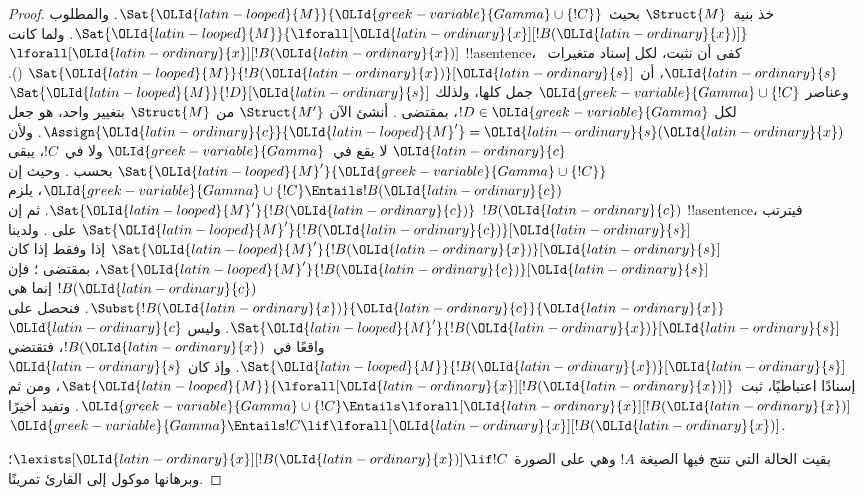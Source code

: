 \documentclass[../../../include/open-logic-section]{subfiles}
\begin{document}
\begin{proof}
{خذ بنية~$\Struct{M}$ بحيث $\Sat{{\OLId{latin-looped}{M}}}{{\OLId{greek-variable}{Gamma}} \cup \{!C\}}$. والمطلوب
$\Sat{{\OLId{latin-looped}{M}}}{\lforall[{\OLId{latin-ordinary}{x}}][!B({\OLId{latin-ordinary}{x}})]}$. ولما كانت
$\lforall[{\OLId{latin-ordinary}{x}}][!B({\OLId{latin-ordinary}{x}})]$ !!a{sentence}، كفى أن نثبت، لكل إسناد
متغيرات~${\OLId{latin-ordinary}{s}}$، أن $\Sat{{\OLId{latin-looped}{M}}}{!B({\OLId{latin-ordinary}{x}})}[{\OLId{latin-ordinary}{s}}]$
(). وعناصر ${\OLId{greek-variable}{Gamma}} \cup \{!C\}$ جمل
كلها، ولذلك $\Sat{{\OLId{latin-looped}{M}}}{!D}[{\OLId{latin-ordinary}{s}}]$ لكل $!D \in {\OLId{greek-variable}{Gamma}}$، بمقتضى
. أنشئ الآن $\Struct{M'}$ من
$\Struct{M}$ بتغيير واحد، هو جعل $\Assign{{\OLId{latin-ordinary}{c}}}{{\OLId{latin-looped}{M}}'} = {\OLId{latin-ordinary}{s}}({\OLId{latin-ordinary}{x}})$. ولأن ${\OLId{latin-ordinary}{c}}$
لا يقع في~${\OLId{greek-variable}{Gamma}}$ ولا في~$!C$، يبقى $\Sat{{\OLId{latin-looped}{M}}'}{{\OLId{greek-variable}{Gamma}} \cup \{!C\}}$
بحسب . وحيث إن ${\OLId{greek-variable}{Gamma}} \cup \{!C\}
\Entails !B({\OLId{latin-ordinary}{c}})$، يلزم $\Sat{{\OLId{latin-looped}{M}}'}{!B({\OLId{latin-ordinary}{c}})}$. ثم إن $!B({\OLId{latin-ordinary}{c}})$ !!a{sentence}،
فيترتب $\Sat{{\OLId{latin-looped}{M}}'}{!B({\OLId{latin-ordinary}{c}})}[{\OLId{latin-ordinary}{s}}]$ على
. ولدينا
$\Sat{{\OLId{latin-looped}{M}}'}{!B({\OLId{latin-ordinary}{x}})}[{\OLId{latin-ordinary}{s}}]$ إذا وفقط إذا كان $\Sat{{\OLId{latin-looped}{M}}'}{!B({\OLId{latin-ordinary}{c}})}[{\OLId{latin-ordinary}{s}}]$، بمقتضى
؛ فإن $!B({\OLId{latin-ordinary}{c}})$ إنما هي
$\Subst{!B({\OLId{latin-ordinary}{x}})}{{\OLId{latin-ordinary}{c}}}{{\OLId{latin-ordinary}{x}}}$. فنحصل على $\Sat{{\OLId{latin-looped}{M}}'}{!B({\OLId{latin-ordinary}{x}})}[{\OLId{latin-ordinary}{s}}]$. وليس ${\OLId{latin-ordinary}{c}}$
واقعًا في~$!B({\OLId{latin-ordinary}{x}})$، فتقتضي 
$\Sat{{\OLId{latin-looped}{M}}}{!B({\OLId{latin-ordinary}{x}})}[{\OLId{latin-ordinary}{s}}]$. وإذ كان ${\OLId{latin-ordinary}{s}}$ إسنادًا اعتباطيًا، ثبت
$\Sat{{\OLId{latin-looped}{M}}}{\lforall[{\OLId{latin-ordinary}{x}}][!B({\OLId{latin-ordinary}{x}})]}$، ومن ثم ${\OLId{greek-variable}{Gamma}} \cup \{!C\} \Entails
\lforall[{\OLId{latin-ordinary}{x}}][!B({\OLId{latin-ordinary}{x}})]$. وتفيد  أخيرًا
${\OLId{greek-variable}{Gamma}} \Entails !C \lif \lforall[{\OLId{latin-ordinary}{x}}][!B({\OLId{latin-ordinary}{x}})]$.

بقيت الحالة التي تنتج فيها \QR{} الصيغة $!A$ وهي على الصورة
$\lexists[{\OLId{latin-ordinary}{x}}][!B({\OLId{latin-ordinary}{x}})] \lif !C$؛ وبرهانها موكول إلى القارئ تمرينًا.}{}
\end{proof}
\end{document}

